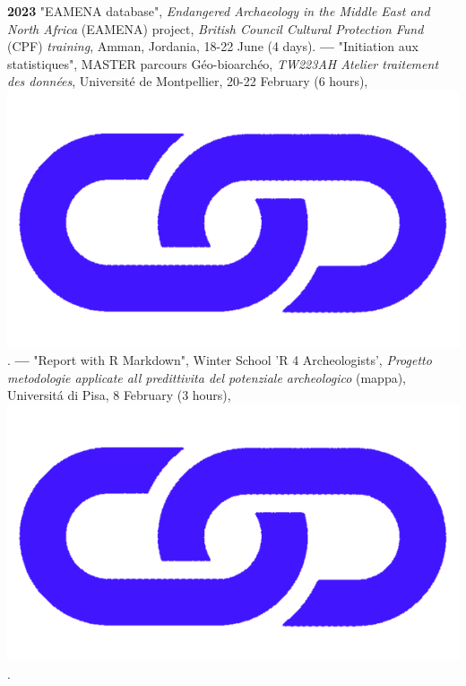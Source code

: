 \documentclass{article}
\begin{document}
\textbf{2023 }"EAMENA database", \textit{Endangered Archaeology in the Middle East and North Africa} (EAMENA) project, \textit{British Council Cultural Protection Fund} (CPF) \textit{training}, Amman, Jordania, 18-22 June (4 days).
\smallbreak
\textbf{--- }"Initiation aux statistiques", MASTER parcours Géo-bioarchéo, \textit{TW223AH Atelier traitement des données}, Universit\'{e} de Montpellier, 20-22 February (6 hours), \href{http://shinyserver.cfs.unipi.it:3838/teach/stats/upv/_site/#/title-slide}{\includegraphics[scale=0.02]{link_darkblue.png}}.
\smallbreak
\textbf{--- }"Report with R Markdown", Winter School 'R 4 Archeologists', \textit{Progetto metodologie applicate all predittivita del potenziale archeologico} (mappa), Universit\'{a} di Pisa, 8 February (3 hours), \href{https://zoometh.github.io/thomashuet/teach/stats/r4a}{\includegraphics[scale=0.02]{link_darkblue.png}}.
\smallbreak
\end{document}

